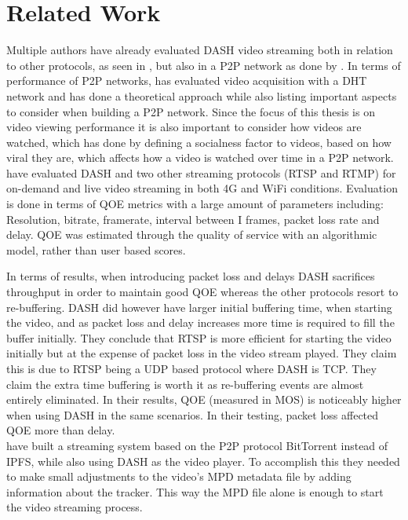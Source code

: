 \chapter{Related Work}
\label{cha:related-work}

Multiple authors have already evaluated \ac{DASH} video streaming both in relation to other protocols, as seen in \citet{aloman2015performance}, but also in a \ac{P2P} network as done by \citet{gazdar2017toward}. In terms of performance of \ac{P2P} networks, \citet{nguyen2009p2p} has evaluated video acquisition with a \ac{DHT} network and \citet{qiu2004modeling} has done a theoretical approach while also listing important aspects to consider when building a \ac{P2P} network. Since the focus of this thesis is on video viewing performance it is also important to consider how videos are watched, which \citet{broxton2013catching} has done by defining a socialness factor to videos, based on how viral they are, which affects how a video is watched over time in a \ac{P2P} network.
\\


\citet{aloman2015performance} have evaluated \ac{DASH} and two other streaming protocols (\ac{RTSP} and \ac{RTMP}) for on-demand and live video streaming in both 4G and WiFi conditions. Evaluation is done in terms of \ac{QOE} metrics with a large amount of parameters including: Resolution, bitrate, framerate, interval between I frames, packet loss rate and delay. \ac{QOE} was estimated through the quality of service with an algorithmic model, rather than user based scores.

In terms of results, when introducing packet loss and delays \ac{DASH} sacrifices throughput in order to maintain good \ac{QOE} whereas the other protocols resort to re-buffering. \ac{DASH} did however have larger initial buffering time, when starting the video, and as packet loss and delay increases more time is required to fill the buffer initially. They conclude that \ac{RTSP} is more efficient for starting the video initially but at the expense of packet loss in the video stream played. They claim this is due to \ac{RTSP} being a \ac{UDP} based protocol where \ac{DASH} is \ac{TCP}. They claim the extra time buffering is worth it as re-buffering events are almost entirely eliminated. In their results, \ac{QOE} (measured in \ac{MOS}) is noticeably higher when using \ac{DASH} in the same scenarios. In their testing, packet loss affected \ac{QOE} more than delay.
\\


\citet{gazdar2017toward} have built a streaming system based on the \ac{P2P} protocol BitTorrent instead of \ac{IPFS}, while also using \ac{DASH} as the video player. To accomplish this they needed to make small adjustments to the video's \ac{MPD} metadata file by adding information about the tracker. This way the \ac{MPD} file alone is enough to start the video streaming process.

